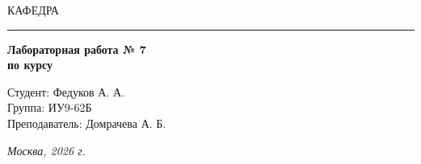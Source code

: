\begin{titlepage}
  \vspace{0.5ex}
  \hspace{-35pt} \noindent \small КАФЕДРА\hspace{50pt} 

  \vspace*{-16pt}
  \hspace{30pt}\rule{0.866\textwidth}{0.4pt}

  \vspace{11em}

  \begin{center}
    \Large {\bf Лабораторная работа № 7} \\
    \large {\bf по курсу } \\
    \large {}

  \end{center}\normalsize

  \vspace{8em}

  \begin{flushright}
    \begin{minipage}{0.5\linewidth}
      {Студент: Федуков А. А. \hspace*{15pt}\\
        Группа: ИУ9-62Б \\
        Преподаватель: Домрачева А. Б.\hspace*{15pt}}
    \end{minipage}
  \end{flushright}
  \bigskip
  \vfill

  \begin{center}
    \textsl{Москва, 2026 г.}
  \end{center}
\end{titlepage}
